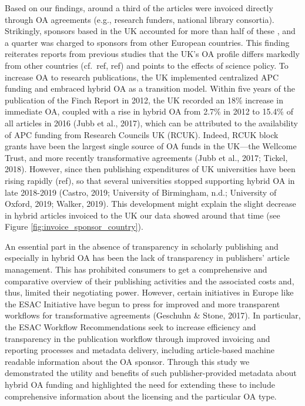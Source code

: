 \documentclass[a4paper,man,floatsintext,longtable,noextraspace,12pt]{apa6}
\begin{document}
Based on our findings, around a third of the articles were invoiced
directly through OA agreements (e.g., research funders, national library
consortia). Strikingly, sponsors based in the UK accounted for more than
half of these , and a quarter was charged to sponsors from other
European countries. This finding reiterates reports from previous
studies that the UK's OA profile differs markedly from other countries
(cf.~ref, ref) and points to the effects of science policy. To increase
OA to research publications, the UK implemented centralized APC funding
and embraced hybrid OA as a transition model. Within five years of the
publication of the Finch Report in 2012, the UK recorded an 18\%
increase in immediate OA, coupled with a rise in hybrid OA from 2.7\% in
2012 to 15.4\% of all articles in 2016 (Jubb et al., 2017), which can be
attributed to the availability of APC funding from Research Councils UK
(RCUK). Indeed, RCUK block grants have been the largest single source of
OA funds in the UK---the Wellcome Trust, and more recently
transformative agreements (Jubb et al., 2017; Tickel, 2018). However,
since then publishing expenditures of UK universities have been rising
rapidly (ref), so that several universities stopped supporting hybrid OA
in late 2018-2019 (Castro, 2019; University of Birmingham, n.d.;
University of Oxford, 2019; Walker, 2019). This development might
explain the slight decrease in hybrid articles invoiced to the UK our
data showed around that time (see Figure
\ref{fig:invoice_sponsor_country}).

An essential part in the absence of transparency in scholarly publishing
and especially in hybrid OA has been the lack of transparency in
publishers' article management. This has prohibited consumers to get a
comprehensive and comparative overview of their publishing activities
and the associated costs and, thus, limited their negotiating power.
However, certain initiatives in Europe like the ESAC Initiative have
begun to press for improved and more transparent workflows for
transformative agreements (Geschuhn \& Stone, 2017). In particular, the
ESAC Workflow Recommendations seek to increase efficiency and
transparency in the publication workflow through improved invoicing and
reporting processes and metadata delivery, including article-based
machine readable information about the OA sponsor. Through this study we
demonstrated the utility and benefits of such publisher-provided
metadata about hybrid OA funding and highlighted the need for extending
these to include comprehensive information about the licensing and the
particular OA type.
\end{document}
